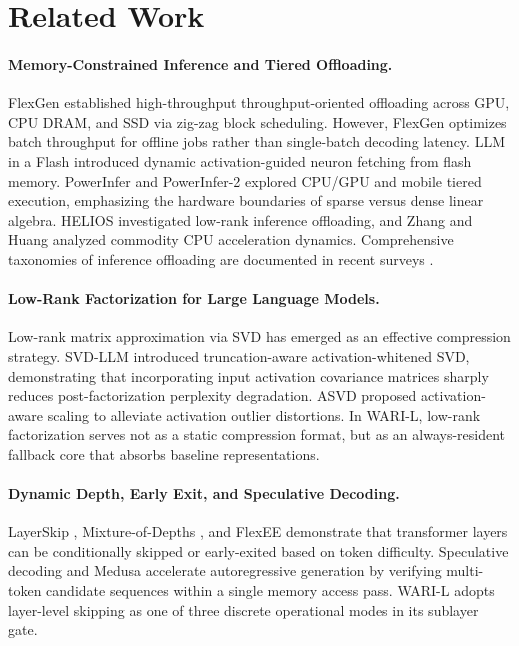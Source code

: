 \documentclass[11pt,a4paper]{article}
\begin{document}
\section{Related Work}
\paragraph{Memory-Constrained Inference and Tiered Offloading.}
FlexGen \cite{sheng2023flexgen} established high-throughput throughput-oriented offloading across GPU, CPU DRAM, and SSD via zig-zag block scheduling. However, FlexGen optimizes batch throughput for offline jobs rather than single-batch decoding latency. LLM in a Flash \cite{alizadeh2024llminflash} introduced dynamic activation-guided neuron fetching from flash memory. PowerInfer \cite{song2024powerinfer} and PowerInfer-2 \cite{xue2024powerinfer2} explored CPU/GPU and mobile tiered execution, emphasizing the hardware boundaries of sparse versus dense linear algebra. HELIOS \cite{kumar2025helios} investigated low-rank inference offloading, and Zhang and Huang \cite{zhang2025challenging} analyzed commodity CPU acceleration dynamics. Comprehensive taxonomies of inference offloading are documented in recent surveys \cite{wan2024efficient, xu2024ondevice, yuan2024unveiled, chen2026ondevice}.

\paragraph{Low-Rank Factorization for Large Language Models.}
Low-rank matrix approximation via SVD has emerged as an effective compression strategy. SVD-LLM \cite{wang2025svdllm} introduced truncation-aware activation-whitened SVD, demonstrating that incorporating input activation covariance matrices sharply reduces post-factorization perplexity degradation. ASVD \cite{yuan2023asvd} proposed activation-aware scaling to alleviate activation outlier distortions. In WARI-L, low-rank factorization serves not as a static compression format, but as an always-resident fallback core that absorbs baseline representations.

\paragraph{Dynamic Depth, Early Exit, and Speculative Decoding.}
LayerSkip \cite{elhoushi2024layerskip}, Mixture-of-Depths \cite{raposo2024mod}, and FlexEE \cite{xie2026flexee} demonstrate that transformer layers can be conditionally skipped or early-exited based on token difficulty. Speculative decoding \cite{leviathan2023speculative} and Medusa \cite{cai2024medusa} accelerate autoregressive generation by verifying multi-token candidate sequences within a single memory access pass. WARI-L adopts layer-level skipping as one of three discrete operational modes in its sublayer gate.
\end{document}
